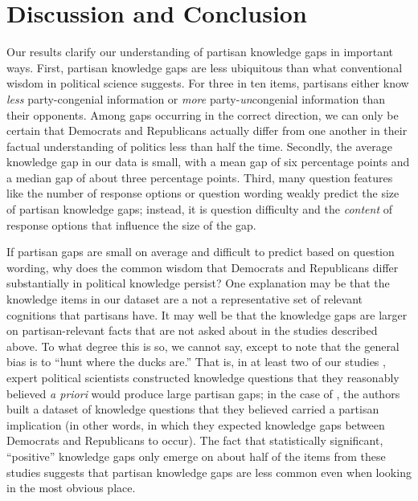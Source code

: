\documentclass[12pt, letterpaper]{article}
\begin{document}
\section*{Discussion and Conclusion}

Our results clarify our understanding of partisan knowledge gaps in important ways. First, partisan knowledge gaps are less ubiquitous than what conventional wisdom in political science suggests. For three in ten items, partisans either know \textit{less} party-congenial information or \textit{more} party-\textit{un}congenial information than their opponents. Among gaps occurring in the correct direction, we can only be certain that Democrats and Republicans actually differ from one another in their factual understanding of politics less than half the time. Secondly, the average knowledge gap in our data is small, with a mean gap of six percentage points and a median gap of about three percentage points. Third, many question features like the number of response options or question wording weakly predict the size of partisan knowledge gaps; instead, it is question difficulty and the \textit{content} of response options that influence the size of the gap.

If partisan gaps are small on average and difficult to predict based on question wording, why does the common wisdom that Democrats and Republicans differ substantially in political knowledge persist? One explanation may be that the knowledge items in our dataset are a not a representative set of relevant cognitions that partisans have. It may well be that the knowledge gaps are larger on partisan-relevant facts that are not asked about in the studies described above. To what degree this is so, we cannot say, except to note that the general bias is to ``hunt where the ducks are.'' That is, in at least two of our studies \citep{bullocketal_2015, prior2015you}, expert political scientists constructed knowledge questions that they reasonably believed \textit{a priori} would produce large partisan gaps; in the case of \citet{jerit2012partisan}, the authors built a dataset of knowledge questions that they believed carried a partisan implication (in other words, in which they expected knowledge gaps between Democrats and Republicans to occur). The fact that statistically significant, ``positive'' knowledge gaps only emerge on about half of the items from these studies suggests that partisan knowledge gaps are less common even when looking in the most obvious place. 
\end{document}
